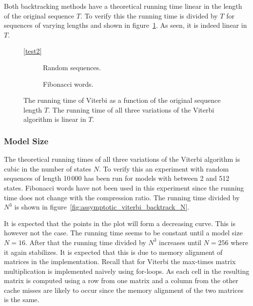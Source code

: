 Both backtracking methods have a theoretical running time linear in the length
of the original sequence $T$. To verify this the running time is divided by $T$
for sequences of varying lengths and shown in
figure~\ref{fig:assymptotic_viterbi_backtrack_T}. As seen, it is indeed linear
in $T$.

\begin{figure}
  \centering\ref{test2}
  \begin{subfigure}[b]{0.5\textwidth}
    \centering 
    \caption{Random sequences.}
  \end{subfigure}%
  \begin{subfigure}[b]{0.5\textwidth}
    \centering 
    \caption{Fibonacci words.}
  \end{subfigure}
  \caption{The running time of Viterbi as a function of the original sequence
    length $T$. The running time of all three variations of the Viterbi
    algorithm is linear in $T$.}
  \label{fig:assymptotic_viterbi_backtrack_T}
\end{figure}

\subsubsection{Model Size}

The theoretical running times of all three variations of the Viterbi algorithm
is cubic in the number of states $N$. To verify this an experiment with random
sequences of length 10\,000 has been run for models with between 2 and 512
states. Fibonacci words have not been used in this experiment since the running
time does not change with the compression ratio. The running time divided by $N^3$ is
shown in figure~\ref{fig:assymptotic_viterbi_backtrack_N}.

It is expected that the points in the plot will form a decreasing curve. This
is however not the case. The running time seems to be constant until a model
size $N = 16$. After that the running time divided by $N^3$ increases until
$N=256$ where it again stabilizes. It is expected that this is due to memory
alignment of matrices in the implementation. Recall that for Viterbi the
max-times matrix multiplication is implemented naively using for-loops.
 As each cell in the resulting matrix is
computed using a row from one matrix and a column from the other cache misses
are likely to occur since the memory alignment of the two matrices is the same.

